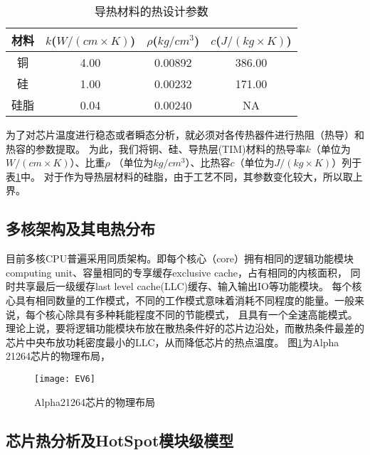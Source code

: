 \begin{table}
\centering
\caption{导热材料的热设计参数}
\begin{tabular}{c c c c}
\hline\hline
材料 & $k$($W/(cm \times K)$) & $\rho$($kg/cm^3$) & $c$($J/(kg \times K)$) \\ [0.5ex]
\hline
铜 & 4.00 & 0.00892 & 386.00  \\
硅 & 1.00 & 0.00232 & 171.00 \\
硅脂 & 0.04 & 0.00240 & NA \\
\hline
\end{tabular}
\label{tab:chap4:cu-si-material}
\end{table}

为了对芯片温度进行稳态或者瞬态分析，就必须对各传热器件进行热阻（热导）和热容的参数提取。 为此，我们将铜、硅、导热层(TIM)材料的热导率$k$（单位为$W/(cm \times K)$）、比重$\rho$ （单位为$kg/cm^3$）、比热容$c$（单位为$J/(kg \times K)$）列于表\ref{tab:chap4:cu-si-material}中。 对于作为导热层材料的硅脂，由于工艺不同，其参数变化较大，所以取上界。


\subsection{多核架构及其电热分布}

目前多核CPU普遍采用同质架构。即每个核心（core）拥有相同的逻辑功能模块computing unit、容量相同的专享缓存exclusive cache，占有相同的内核面积， 同时共享最后一级缓存last level cache(LLC)缓存、输入输出IO等功能模块。 每个核心具有相同数量的工作模式，不同的工作模式意味着消耗不同程度的能量。一般来说，每个核心除具有多种耗能程度不同的节能模式， 且具有一个全速高能模式。
理论上说，要将逻辑功能模块布放在散热条件好的芯片边沿处，而散热条件最差的芯片中央布放功耗密度最小的LLC，从而降低芯片的热点温度。 图\ref{fig:ev6}为Alpha 21264芯片的物理布局，

\begin{figure}[H]
  \centering
  \texttt{[image: EV6]}
  \caption{Alpha21264芯片的物理布局}
  \label{fig:ev6}
\end{figure}


\subsection{芯片热分析及HotSpot模块级模型}

